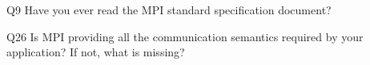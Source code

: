 \begin{description}%
\item{Q9} Have you ever read the MPI standard specification document?%
\item{Q26} Is MPI providing all the communication semantics required by your application? If not, what is missing?%
\end{description}%
